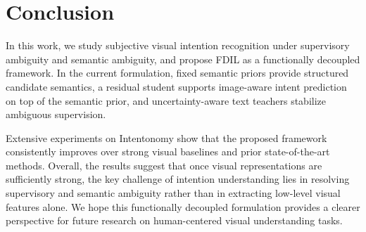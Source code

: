 \section{Conclusion}
\label{sec:conclusion}

In this work, we study subjective visual intention recognition under supervisory ambiguity and semantic ambiguity, and propose FDIL as a functionally decoupled framework. In the current formulation, fixed semantic priors provide structured candidate semantics, a residual student supports image-aware intent prediction on top of the semantic prior, and uncertainty-aware text teachers stabilize ambiguous supervision.

Extensive experiments on Intentonomy show that the proposed framework consistently improves over strong visual baselines and prior state-of-the-art methods. Overall, the results suggest that once visual representations are sufficiently strong, the key challenge of intention understanding lies in resolving supervisory and semantic ambiguity rather than in extracting low-level visual features alone. We hope this functionally decoupled formulation provides a clearer perspective for future research on human-centered visual understanding tasks.
